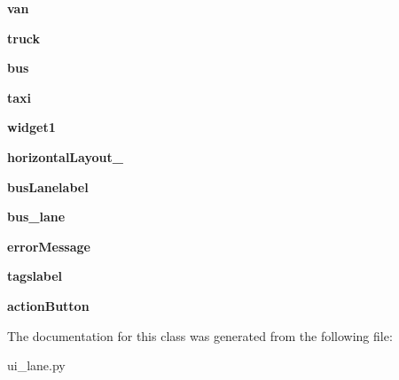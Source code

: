 \begin{DoxyCompactItemize}
\item 
\hypertarget{class_sim_g_d_c_1_1ui__lane_1_1_ui___lane_ae8d2f2b589fa9128f66ee770c2374a44}{}{\bfseries van}\label{class_sim_g_d_c_1_1ui__lane_1_1_ui___lane_ae8d2f2b589fa9128f66ee770c2374a44}

\item 
\hypertarget{class_sim_g_d_c_1_1ui__lane_1_1_ui___lane_a169dfbe4f1aae728618cb961e3eba4d4}{}{\bfseries truck}\label{class_sim_g_d_c_1_1ui__lane_1_1_ui___lane_a169dfbe4f1aae728618cb961e3eba4d4}

\item 
\hypertarget{class_sim_g_d_c_1_1ui__lane_1_1_ui___lane_ab02f4f55a23e60c722942c472aaae66e}{}{\bfseries bus}\label{class_sim_g_d_c_1_1ui__lane_1_1_ui___lane_ab02f4f55a23e60c722942c472aaae66e}

\item 
\hypertarget{class_sim_g_d_c_1_1ui__lane_1_1_ui___lane_aa430fbd0bc536484c87d72b414969663}{}{\bfseries taxi}\label{class_sim_g_d_c_1_1ui__lane_1_1_ui___lane_aa430fbd0bc536484c87d72b414969663}

\item 
\hypertarget{class_sim_g_d_c_1_1ui__lane_1_1_ui___lane_a4bf04ad92f47be64b6971a3993c479a6}{}{\bfseries widget1}\label{class_sim_g_d_c_1_1ui__lane_1_1_ui___lane_a4bf04ad92f47be64b6971a3993c479a6}

\item 
\hypertarget{class_sim_g_d_c_1_1ui__lane_1_1_ui___lane_a8040be6c40d80e042ed275b8633fec8b}{}{\bfseries horizontal\+Layout\+\_}\label{class_sim_g_d_c_1_1ui__lane_1_1_ui___lane_a8040be6c40d80e042ed275b8633fec8b}

\item 
\hypertarget{class_sim_g_d_c_1_1ui__lane_1_1_ui___lane_aaada2c3136e80d18d98d6d66da0c59c9}{}{\bfseries bus\+Lanelabel}\label{class_sim_g_d_c_1_1ui__lane_1_1_ui___lane_aaada2c3136e80d18d98d6d66da0c59c9}

\item 
\hypertarget{class_sim_g_d_c_1_1ui__lane_1_1_ui___lane_aa956779da4c3c4b27bc379e0c7047fca}{}{\bfseries bus\+\_\+lane}\label{class_sim_g_d_c_1_1ui__lane_1_1_ui___lane_aa956779da4c3c4b27bc379e0c7047fca}

\item 
\hypertarget{class_sim_g_d_c_1_1ui__lane_1_1_ui___lane_a9508d7e74dbd07629db3b3dc6e6ea162}{}{\bfseries error\+Message}\label{class_sim_g_d_c_1_1ui__lane_1_1_ui___lane_a9508d7e74dbd07629db3b3dc6e6ea162}

\item 
\hypertarget{class_sim_g_d_c_1_1ui__lane_1_1_ui___lane_aa71d671204e171146f125415f20361b0}{}{\bfseries tagslabel}\label{class_sim_g_d_c_1_1ui__lane_1_1_ui___lane_aa71d671204e171146f125415f20361b0}

\item 
\hypertarget{class_sim_g_d_c_1_1ui__lane_1_1_ui___lane_a222dd6ecafcb2687387e196613adfb12}{}{\bfseries action\+Button}\label{class_sim_g_d_c_1_1ui__lane_1_1_ui___lane_a222dd6ecafcb2687387e196613adfb12}

\end{DoxyCompactItemize}


The documentation for this class was generated from the following file\+:\begin{DoxyCompactItemize}
\item 
ui\+\_\+lane.\+py\end{DoxyCompactItemize}
